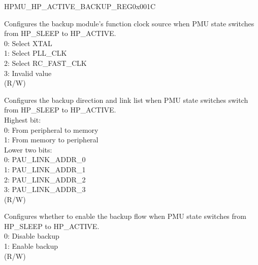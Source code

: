     \begin{register}{H}{PMU\_HP\_ACTIVE\_BACKUP\_REG}{0x001C}\label{regdesc:PMUHPACTIVEBACKUPREG}
    \regnewline%
    \begin{regdesc}\begin{reglist}

    \label{fielddesc:PMUHPSLEEP2ACTIVEBACKUPCLKSEL}\item [PMU\_HP\_SLEEP2ACTIVE\_BACKUP\_CLK\_SEL] Configures the backup module's function clock source when PMU state switches from HP\_SLEEP to HP\_ACTIVE.\\
0: Select XTAL\\
1: Select PLL\_CLK\\
2: Select RC\_FAST\_CLK\\
3: Invalid value\\
(R/W)
    \label{fielddesc:PMUHPSLEEP2ACTIVEBACKUPMODE}\item [PMU\_HP\_SLEEP2ACTIVE\_BACKUP\_MODE] Configures the backup direction and link list when PMU state switches switch from HP\_SLEEP to HP\_ACTIVE.\\
Highest bit:\\
0: From peripheral to memory\\
1: From memory to peripheral\\
Lower two bits:\\
0: PAU\_LINK\_ADDR\_0 \\
1: PAU\_LINK\_ADDR\_1 \\
2: PAU\_LINK\_ADDR\_2 \\
3: PAU\_LINK\_ADDR\_3 \\
(R/W)

    \label{fielddesc:PMUHPSLEEP2ACTIVEBACKUPEN}\item [PMU\_HP\_SLEEP2ACTIVE\_BACKUP\_EN] Configures whether to enable the backup flow when PMU state switches from HP\_SLEEP to HP\_ACTIVE. \\
0: Disable backup\\
1: Enable backup\\
(R/W)
    \end{reglist}\end{regdesc}
    \end{register}


